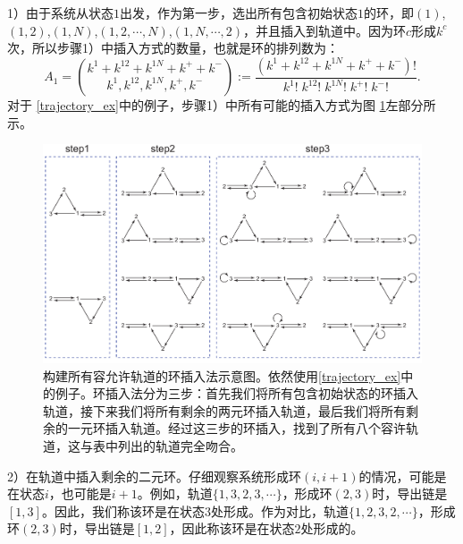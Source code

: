 1）由于系统从状态$1$出发，作为第一步，选出所有包含初始状态$1$的环，即$(1)$,$(1,2)$,$(1,N)$,$(1,2,\cdots,N)$,$(1,N,\cdots,2)$，并且插入到轨道中。因为环$c$形成$k^c$次，所以步骤1）中插入方式的数量，也就是环的排列数为：
\begin{equation*}\label{formula:A1}
    A_1 = \binom{k^1+k^{12}+k^{1N}+k^{+}+k^{-}}{k^1,k^{12},k^{1N},k^{+},k^{-}}
    := \frac{(k^1+k^{12}+k^{1N}+k^{+}+k^{-})!}{k^1!\;k^{12}!\;k^{1N}!\;k^{+}!\;k^{-}!}.
\end{equation*}
对于 \ref{trajectory_ex}中的例子，步骤1）中所有可能的插入方式为图 \ref{figure:insertion}左部分所示。
\begin{figure}[htb!]
\centering
\includegraphics[scale=0.6]{chart/insertiongraph.pdf}
\caption{构建所有容允许轨道的环插入法示意图。依然使用\ref{trajectory_ex}中的例子。环插入法分为三步：首先我们将所有包含初始状态的环插入轨道，接下来我们将所有剩余的两元环插入轨道，最后我们将所有剩余的一元环插入轨道。经过这三步的环插入，找到了所有八个容许轨道，这与表中列出的轨道完全吻合。}
\label{figure:insertion}
\end{figure}

2）在轨道中插入剩余的二元环。仔细观察系统形成环$(i,i+1)$的情况，可能是在状态$i$，也可能是$i+1$。例如，轨道$\{1, 3, 2, 3, \cdots\}$，形成环$(2,3)$时，导出链是$[1, 3]$。因此，我们称该环是在状态$3$处形成。作为对比，轨道$\{1,2,3,2, \cdots\}$，形成环$(2,3)$时，导出链是$[1, 2]$，因此称该环是在状态$2$处形成的。

